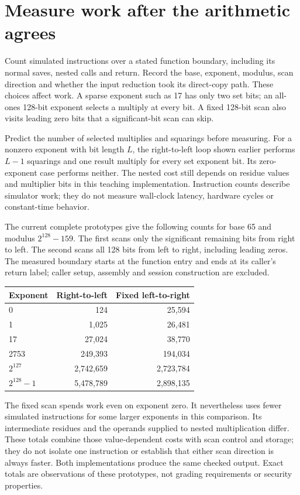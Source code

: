 \section{Measure work after the arithmetic agrees}
Count simulated instructions over a stated function boundary, including its normal
saves, nested calls and return. Record the base, exponent, modulus, scan direction and
whether the input reduction took its direct-copy path. These choices affect work.
A sparse exponent such as 17 has only two set bits; an all-ones 128-bit exponent
selects a multiply at every bit. A fixed 128-bit scan also visits leading zero bits
that a significant-bit scan can skip.

Predict the number of selected multiplies and squarings before measuring. For a
nonzero exponent with bit length \(L\), the right-to-left loop shown earlier performs
\(L-1\) squarings and one result multiply for every set exponent bit. Its zero-exponent
case performs neither. The nested cost still depends on residue values and multiplier
bits in this teaching implementation. Instruction counts describe simulator work;
they do not measure wall-clock latency, hardware cycles or constant-time behavior.

The current complete prototypes give the following counts for base 65 and modulus
\(2^{128}-159\). The first scans only the significant remaining bits from right to
left. The second scans all 128 bits from left to right, including leading zeros.
The measured boundary starts at the function entry and ends at its caller's return
label; caller setup, assembly and session construction are excluded.
\begin{center}
\begin{tabular}{lrr}
Exponent & Right-to-left & Fixed left-to-right \\
\hline
0 & 124 & 25,594 \\
1 & 1,025 & 26,481 \\
17 & 27,024 & 38,770 \\
2753 & 249,393 & 194,034 \\
\(2^{127}\) & 2,742,659 & 2,723,784 \\
\(2^{128}-1\) & 5,478,789 & 2,898,135 \\
\end{tabular}
\end{center}
The fixed scan spends work even on exponent zero. It nevertheless uses fewer simulated
instructions for some larger exponents in this comparison. Its intermediate residues
and the operands supplied to nested multiplication differ. These totals combine those
value-dependent costs with scan control and storage; they do not isolate one instruction
or establish that either scan direction is always faster. Both implementations produce
the same checked output. Exact totals are observations of these prototypes, not grading
requirements or security properties.


